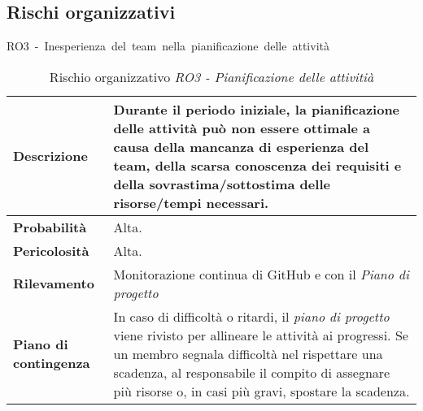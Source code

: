 
\begin{table}[!h]
    \subsection{Rischi organizzativi}
    \centering
    \hbox{RO3 - Inesperienza del team nella pianificazione delle attività}
    \vspace{0.3cm}
	\begin{tabular}{|l|p{10cm}|} 
		\hline
		\textbf{Descrizione} & Durante il periodo iniziale, la pianificazione delle attività può non essere ottimale a causa della mancanza di esperienza del team, della scarsa conoscenza dei requisiti e della sovrastima/sottostima delle risorse/tempi necessari. \\ 
        \hline
        \textbf{Probabilità} & Alta. \\
        \hline
        \textbf{Pericolosità} & Alta. \\
        \hline
        \textbf{Rilevamento} & Monitorazione continua di GitHub e con il \textit{Piano di progetto} \\
        \hline
        \textbf{Piano di contingenza} & In caso di difficoltà o ritardi, il \textit{piano di progetto} viene rivisto per allineare le attività ai progressi. Se un membro segnala difficoltà nel rispettare una scadenza, al responsabile il compito di assegnare più risorse o, in casi più gravi, spostare la scadenza.\\
		\hline
	\end{tabular}
    \caption{Rischio organizzativo \textit{RO3 - Pianificazione delle attivitià}}
    \label{table:1}
\end{table}

